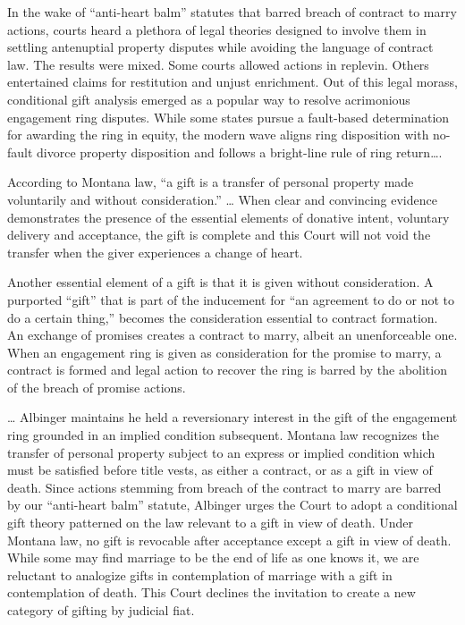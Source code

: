 In the wake of ``anti-heart balm'' statutes that barred breach of contract to
marry actions, courts heard a plethora of legal theories designed to involve
them in settling antenuptial property disputes while avoiding the language of
contract law. The results were mixed. Some courts allowed actions in replevin.
Others entertained claims for restitution and unjust enrichment. Out of this
legal morass, conditional gift analysis emerged as a popular way to resolve
acrimonious engagement ring disputes. While some states pursue a fault-based
determination for awarding the ring in equity, the modern wave aligns ring
disposition with no-fault divorce property disposition and follows a
bright-line rule of ring return\dots{}.


According to Montana law, ``a gift is a transfer of personal property made
voluntarily and without consideration.'' \dots{} When clear and convincing
evidence demonstrates the presence of the essential elements of donative
intent, voluntary delivery and acceptance, the gift is complete and this Court
will not void the transfer when the giver experiences a change of heart. 

Another essential element of a gift is that it is given without consideration. A
purported ``gift'' that is part of the inducement for ``an agreement to do or
not to do a certain thing,'' becomes the consideration essential to contract
formation. An exchange of promises creates a contract to marry, albeit an
unenforceable one. When an engagement ring is given as consideration for the
promise to marry, a contract is formed and legal action to recover the ring is
barred by the abolition of the breach of promise actions.

\dots{} Albinger maintains he held a reversionary interest in the gift of the
engagement ring grounded in an implied condition subsequent. Montana law
recognizes the transfer of personal property subject to an express or implied
condition which must be satisfied before title vests, as either a contract, or
as a gift in view of death. Since actions stemming from breach of the contract
to marry are barred by our ``anti-heart balm'' statute, Albinger urges the
Court to adopt a conditional gift theory patterned on the law relevant to a
gift in view of death. Under Montana law, no gift is revocable after acceptance
except a gift in view of death. While some may find marriage to be the end of
life as one knows it, we are reluctant to analogize gifts in contemplation of
marriage with a gift in contemplation of death. This Court declines the
invitation to create a new category of gifting by judicial fiat.

